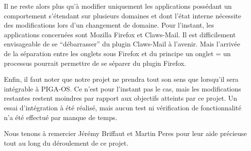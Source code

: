 \documentclass[pdftex,a4paper,titlepage,11pt]{article}
\begin{document}
Il ne reste alors plus qu'à modifier uniquement les applications possédant un comportement s'étendant sur plusieurs domaines et dont l'état interne nécessite des modifications lors d'un changement de domaine. Pour l'instant, les applications concernées sont Mozilla Firefox et Claws-Mail. Il est difficilement envisageable de se ``débarrasser'' du plugin Claws-Mail à l'avenir. Mais l'arrivée de la séparation entre les onglets sous Firefox et du principe un onglet = un processus pourrait permettre de se séparer du plugin Firefox.

Enfin, il faut noter que notre projet ne prendra tout son sens que lorsqu'il sera intégrable à PIGA-OS. Ce n'est pour l'instant pas le cas, mais les modifications restantes restent moindres par rapport aux objectifs atteints par ce projet. Un essai d'intégration à été réalisé, mais aucun test ni vérification de fonctionnalité n'a été effectué par manque de temps.

Nous tenons à remercier Jérémy Briffaut et Martin Peres pour leur aide précieuse tout au long du déroulement de ce projet.


\newpage
\end{document}
